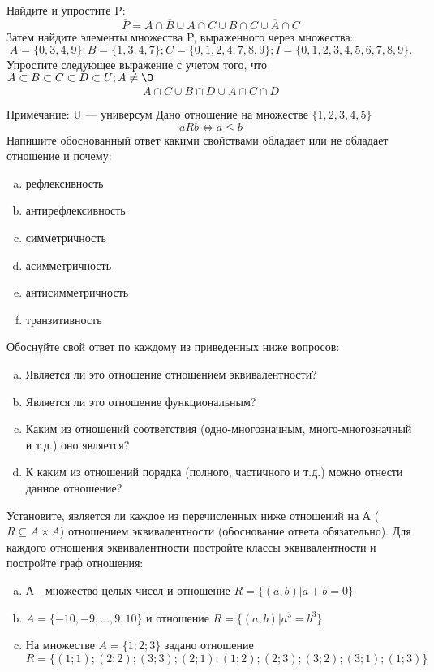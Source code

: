 \documentclass[10pt]{exam}
\begin{document}
\begin{questions}
\question
Найдите и упростите P:
\begin{equation*}
\overline{P} = A \cap \overline{B} \cup A \cap C \cup B \cap C \cup \overline{A} \cap C
\end{equation*}
Затем найдите элементы множества P, выраженного через множества:
\begin{equation*}
A = \{0, 3, 4, 9\}; 
B = \{1, 3, 4, 7\};
C = \{0, 1, 2, 4, 7, 8, 9\};
I = \{0, 1, 2, 3, 4, 5, 6, 7, 8, 9\}.
\end{equation*}\question
Упростите следующее выражение с учетом того, что $A\subset B \subset C \subset D \subset U; A \neq \O$
\begin{equation*}
A \cap  \overline{C} \cup B \cap \overline{D} \cup  \overline{A} \cap C \cap  \overline{D}
\end{equation*}

Примечание: U — универсум\question
Дано отношение на множестве $\{1, 2, 3, 4, 5\}$ 
\begin{equation*}
aRb \iff a \leq b
\end{equation*}
Напишите обоснованный ответ какими свойствами обладает или не обладает отношение и почему:   
\begin{enumerate} [a)]\setcounter{enumi}{0}
\item рефлексивность
\item антирефлексивность
\item симметричность
\item асимметричность
\item антисимметричность
\item транзитивность
\end{enumerate}

Обоснуйте свой ответ по каждому из приведенных ниже вопросов:
\begin{enumerate} [a)]\setcounter{enumi}{0}
    \item Является ли это отношение отношением эквивалентности?
    \item Является ли это отношение функциональным?
    \item Каким из отношений соответствия (одно-многозначным, много-многозначный и т.д.) оно является?
    \item К каким из отношений порядка (полного, частичного и т.д.) можно отнести данное отношение?
\end{enumerate}


\question
Установите, является ли каждое из перечисленных ниже отношений на А ($R \subseteq A \times A$) отношением эквивалентности (обоснование ответа обязательно). Для каждого отношения эквивалентности 
постройте классы эквивалентности и постройте граф отношения:
\begin{enumerate}[a)]\setcounter{enumi}{0}
\item А - множество целых чисел и отношение $R = \{(a,b)|a + b = 0\}$
\item $A = \{-10, -9, …, 9, 10\}$ и отношение $R = \{(a,b)|a^{3} = b^{3}\}$
\item На множестве $A = \{1; 2; 3\}$ задано отношение $R = \{(1; 1); (2; 2); (3; 3); (2; 1); (1; 2); (2; 3); (3; 2); (3; 1); (1; 3)\}$


\end{enumerate}
\end{questions}
\end{document}
